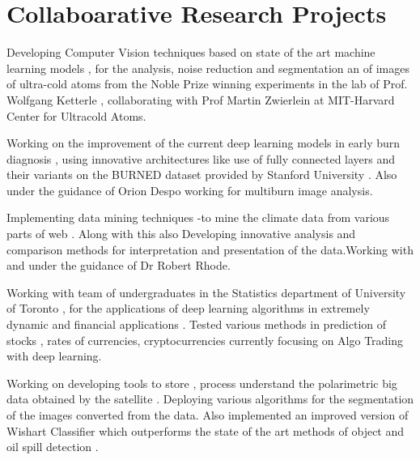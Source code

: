 \documentclass[]{deedy-resume-openfont}
\begin{document}






\section{Collaboarative Research Projects}
\hline
\vspace{\topsep}


Developing Computer Vision techniques based on state of the art machine learning models , for the analysis, noise reduction and segmentation an of images of ultra-cold atoms from the Noble Prize winning experiments in the lab of Prof.  Wolfgang Ketterle , collaborating with Prof Martin Zwierlein at MIT-Harvard Center for Ultracold Atoms.

\sectionsep

Working on the improvement of the current deep learning models in early burn diagnosis , using innovative architectures like use of fully connected layers and their variants on the BURNED dataset provided by Stanford University .  Also under the guidance of Orion Despo working for multiburn image analysis.
\sectionsep

Implementing  data mining techniques -to mine the climate data from various parts of web . Along with this also Developing innovative analysis and comparison methods for interpretation and presentation of the data.Working with and under the guidance of Dr Robert Rhode.
\sectionsep

Working with team of  undergraduates in the Statistics department of University of Toronto , for the applications of deep learning algorithms in extremely dynamic and financial applications . Tested various methods in prediction of stocks , rates of currencies, cryptocurrencies currently focusing on Algo Trading with deep learning.
\sectionsep

Working on developing tools to store , process understand the polarimetric big data obtained by the satellite . Deploying various algorithms for the segmentation of the images converted from the data. Also implemented an improved version of Wishart Classifier which outperforms the state of the art methods of object and oil spill detection .
\sectionsep
\end{document}
